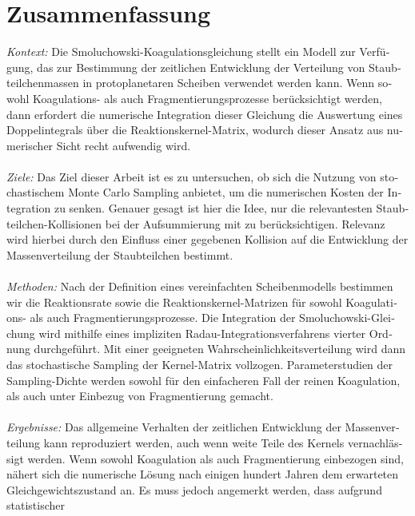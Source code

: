 \cleardoublepage\chapter*{Zusammenfassung}

\thispagestyle{NoHeader}

\begin{otherlanguage}{german}

\textit{Kontext:}
Die Smoluchowski-Koagulationsgleichung stellt ein Modell zur Verfügung, das zur Bestimmung der 
zeitlichen Entwicklung der Verteilung von Staubteilchenmassen in protoplanetaren Scheiben verwendet 
werden kann. Wenn sowohl Koagulations- als auch Fragmentierungsprozesse berücksichtigt werden, dann 
erfordert die numerische Integration dieser Gleichung die Auswertung eines Doppelintegrals über die 
Reaktionskernel-Matrix, wodurch dieser Ansatz aus numerischer Sicht recht aufwendig wird.
\\ \ \\
\textit{Ziele:}
Das Ziel dieser Arbeit ist es zu untersuchen, ob sich die Nutzung von stochastischem 
Monte Carlo Sampling anbietet, um die numerischen Kosten der Integration zu senken.
Genauer gesagt ist hier die Idee, nur die relevantesten Staubteilchen-Kollisionen 
bei der Aufsummierung mit zu berücksichtigen.
Relevanz wird hierbei durch den Einfluss einer gegebenen Kollision auf die
Entwicklung der Massenverteilung der Staubteilchen bestimmt.
\\ \ \\
\textit{Methoden:}
Nach der Definition eines vereinfachten Scheibenmodells bestimmen wir die Reaktionsrate sowie die 
Reaktionskernel-Matrizen für sowohl Koagulations- als auch Fragmentierungsprozesse.
Die Integration der Smoluchowski-Gleichung wird mithilfe eines impliziten
Radau-Integrationsverfahrens vierter Ordnung durchgeführt. 
Mit einer geeigneten Wahrscheinlichkeitsverteilung wird dann das stochastische Sampling der 
Kernel-Matrix vollzogen. Parameterstudien der Sampling-Dichte werden sowohl für den 
einfacheren Fall der reinen Koagulation, als auch unter Einbezug von Fragmentierung gemacht.
\\ \ \\
\textit{Ergebnisse:}
Das allgemeine Verhalten der zeitlichen Entwicklung der Massenverteilung kann reproduziert werden, 
auch wenn weite Teile des Kernels vernachlässigt werden. Wenn sowohl Koagulation als auch 
Fragmentierung einbezogen sind, nähert sich die numerische Lösung nach einigen hundert Jahren dem
erwarteten Gleichgewichtszustand an. Es muss jedoch angemerkt werden, dass aufgrund statistischer

\end{otherlanguage}
